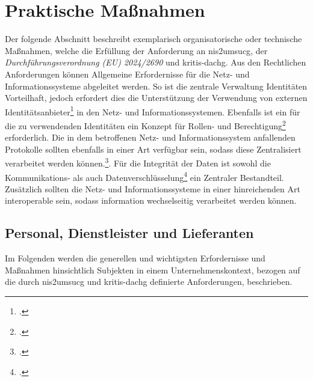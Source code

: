 \documentclass[11pt,a4paper,hidelinks]{article}   %
\begin{document}
    \newpage
    \section{Praktische Maßnahmen}\label{sec:ParktischeMaßnahmen}
    Der folgende Abschnitt beschreibt exemplarisch organisatorische oder technische Maßnahmen, welche die Erfüllung der Anforderung an \gls{nis2umsucg}, der \emph{Durchführungsverordnung (EU) 2024/2690} und \gls{kritis-dachg}. Aus den Rechtlichen Anforderungen können Allgemeine Erfordernisse für die Netz- und Informationssysteme abgeleitet werden. So ist die zentrale Verwaltung Identitäten Vorteilhaft, jedoch erfordert dies die Unterstützung der Verwendung von externen Identitätsanbieter\footcite[Vgl. Nummer 3.2.3., 11.2.2.,][]{EU2024-2690} in den Netz- und Informationssystemen. Ebenfalls ist ein für die zu verwendenden Identitäten ein Konzept für Rollen- und Berechtigung\footcite[Vgl. Nummer 11.2.2.,][]{EU2024-2690} erforderlich. Die in dem betroffenen Netz- und Informationssystem anfallenden Protokolle sollten ebenfalls in einer Art verfügbar sein, sodass diese Zentralisiert verarbeitet werden können.\footcite[Vgl. Nummer 3.2.2., 3.2.3.][]{EU2024-2690}. Für die Integrität der Daten ist sowohl die Kommunikations- als auch Datenverschlüsselung\footcite[Vgl. Nummer 9.2][]{EU2024-2690} ein Zentraler Bestandteil. Zusätzlich sollten die Netz- und Informationssysteme in einer hinreichenden Art interoperable sein, sodass information wechselseitig verarbeitet werden können. 
        \subsection{Personal, Dienstleister und Lieferanten}
        Im Folgenden werden die generellen und wichtigsten Erfordernisse und Maßnahmen hinsichtlich Subjekten in einem Unternehmenskontext, bezogen auf die durch \gls{nis2umsucg} und \gls{kritis-dachg} definierte Anforderungen, beschrieben.
\end{document}
